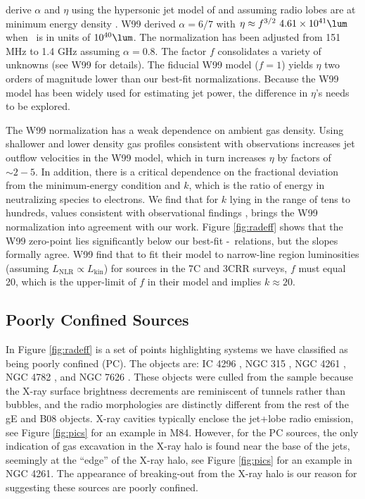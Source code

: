 \documentclass{emulateapj}
\begin{document}
\citet[][hereafter W99]{1999MNRAS.309.1017W} derive $\alpha$ and
$\eta$ using the hypersonic jet model of \citet{1991MNRAS.250..581F}
and assuming radio lobes are at minimum energy density \citep[see][for
  details]{1980ARA&A..18..165M}. W99 derived $\alpha = 6/7$ with $\eta
\approx f^{3/2}~4.61\times10^{41} \lum$ when \prad\ is in units of
$10^{40} \lum$. The normalization has been adjusted from 151 MHz to
1.4 GHz assuming $\alpha = 0.8$. The factor $f$ consolidates a variety
of unknowns (see W99 for details). The fiducial W99 model ($f=1$)
yields $\eta$ two orders of magnitude lower than our best-fit
normalizations. Because the W99 model has been widely used for
estimating jet power, the difference in $\eta$'s needs to be explored.

The W99 normalization has a weak dependence on ambient gas density.
Using shallower and lower density gas profiles consistent with
observations increases jet outflow velocities in the W99 model, which
in turn increases $\eta$ by factors of $\sim 2-5$. In addition, there
is a critical dependence on the fractional deviation from the
minimum-energy condition and $k$, which is the ratio of energy in
neutralizing species to electrons. We find that for $k$ lying in the
range of tens to hundreds, values consistent with observational
findings \citep{2005MNRAS.364.1343D, 2006MNRAS.372.1741D,
  2006ApJ...648..200D, birzan08}, brings the W99 normalization into
agreement with our work. Figure \ref{fig:radeff} shows that the W99
zero-point lies significantly below our best-fit
\pjet-\prad\ relations, but the slopes formally agree. W99 find that
to fit their model to narrow-line region luminosities (assuming
$L_{\mathrm{NLR}} \propto L_{\mathrm{kin}}$) for sources in the 7C and
3CRR surveys, $f$ must equal 20, which is the upper-limit of $f$ in
their model and implies $k \approx 20$.

\subsection{Poorly Confined Sources}
\label{sec:jet}

In Figure \ref{fig:radeff} is a set of points highlighting systems we
have classified as being poorly confined (PC). The objects are: IC
4296 \citep{1988ApJ...324..198K, 2003ApJ...585..677P}, NGC 315
\citep{1979ApJ...228L...9B, 1981A&A....95..250W}, NGC 4261
\citep{1997ApJ...484..186J, 2000ApJ...534..165J}, NGC 4782
\citep{2007ApJ...664..804M}, and NGC 7626 \citep{1985ApJ...291...32B}.
These objects were culled from the sample because the X-ray surface
brightness decrements are reminiscent of tunnels rather than bubbles,
and the radio morphologies are distinctly different from the rest of
the gE and B08 objects. X-ray cavities typically enclose the jet+lobe
radio emission, see Figure \ref{fig:pics} for an example in
M84. However, for the PC sources, the only indication of gas
excavation in the X-ray halo is found near the base of the jets,
seemingly at the ``edge'' of the X-ray halo, see Figure \ref{fig:pics}
for an example in NGC 4261. The appearance of breaking-out from the
X-ray halo is our reason for suggesting these sources are poorly
confined.
\end{document}
